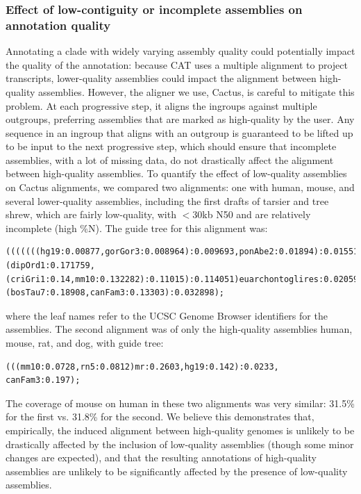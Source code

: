 \documentclass[fleqn,10pt]{wlscirep}
\begin{document}
\subsubsection*{Effect of low-contiguity or incomplete assemblies on annotation quality}
Annotating a clade with widely varying assembly quality could potentially impact the quality of the annotation: because CAT uses a multiple alignment to project transcripts, lower-quality assemblies could impact the alignment between high-quality assemblies. However, the aligner we use, Cactus, is careful to mitigate this problem. At each progressive step, it aligns the ingroups against multiple outgroups, preferring assemblies that are marked as high-quality by the user. Any sequence in an ingroup that aligns with an outgroup is guaranteed to be lifted up to be input to the next progressive step, which should ensure that incomplete assemblies, with a lot of missing data, do not drastically affect the alignment between high-quality assemblies. To quantify the effect of low-quality assemblies on Cactus alignments, we compared two alignments: one with human, mouse, and several lower-quality assemblies, including the first drafts of tarsier and tree shrew, which are fairly low-quality, with $<$30kb N50 and are relatively incomplete (high \%N). The guide tree for this alignment was:
\begin{lstlisting}
(((((((hg19:0.00877,gorGor3:0.008964):0.009693,ponAbe2:0.01894):0.015511,rheMac3:0.037601):0.07392,tarSyr1:0.1114):0.034014,tupChi1:0.19114):0.002,(dipOrd1:0.171759,(criGri1:0.14,mm10:0.132282):0.11015):0.114051)euarchontoglires:0.020593,(bosTau7:0.18908,canFam3:0.13303):0.032898);
\end{lstlisting}
where the leaf names refer to the UCSC Genome Browser identifiers for the assemblies. The second alignment was of only the high-quality assemblies human, mouse, rat, and dog, with guide tree:
\begin{lstlisting}
(((mm10:0.0728,rn5:0.0812)mr:0.2603,hg19:0.142):0.0233, canFam3:0.197);
\end{lstlisting}
The coverage of mouse on human in these two alignments was very similar: 31.5\% for the first vs. 31.8\% for the second. We believe this demonstrates that, empirically, the induced alignment between high-quality genomes is unlikely to be drastically affected by the inclusion of low-quality assemblies (though some minor changes are expected), and that the resulting annotations of high-quality assemblies are unlikely to be significantly affected by the presence of low-quality assemblies.
\end{document}
